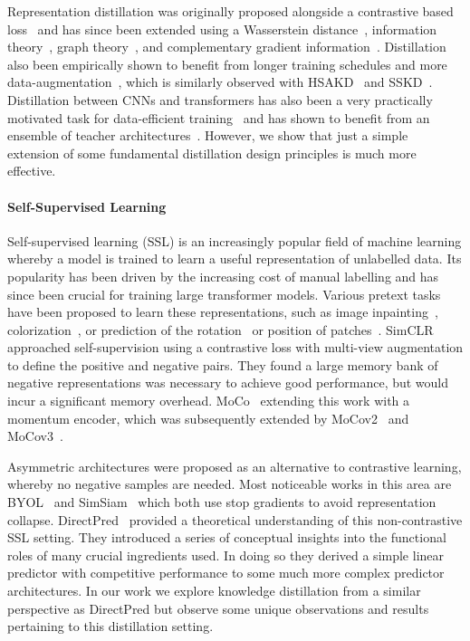 \documentclass[letterpaper]{article} \usepackage[submission]{aaai23}  \usepackage{times}  \usepackage{helvet}  \usepackage{courier}  \usepackage[hyphens]{url}  \usepackage{graphicx} \urlstyle{rm} \def\UrlFont{\rm}  \usepackage{natbib}  \usepackage{caption} \frenchspacing  \setlength{\pdfpagewidth}{8.5in} \setlength{\pdfpageheight}{11in} \usepackage{algorithm}
\begin{document}
Representation distillation was originally proposed alongside a contrastive based loss~\cite{Tian2019ContrastiveDistillation} and has since been extended using a Wasserstein distance~\cite{Chen2020WassersteinDistillation}, information theory~\cite{Miles2022InformationDistillation}, graph theory~\cite{Ma2022DistillingAlignment}, and complementary gradient information~\cite{Zhu2021ComplementaryDistillation}. Distillation also been empirically shown to benefit from longer training schedules and more data-augmentation~\cite{Beyer2022KnowledgeConsistent}, which is similarly observed with HSAKD~\cite{Yang2021HierarchicalDistillation} and SSKD~\cite{Xu2020KnowledgeSelf-supervision}.
Distillation between CNNs and transformers has also been a very practically motivated task for data-efficient training~\cite{Touvron2021TrainingAttention} and has shown to benefit from an ensemble of teacher architectures~\cite{Ren2022Co-advise:Distillation}. However, we show that just a simple extension of some fundamental distillation design principles is much more effective.

\paragraph{Self-Supervised Learning}
Self-supervised learning (SSL) is an increasingly popular field of machine learning whereby a model is trained to learn a useful representation of unlabelled data. Its popularity has been driven by the increasing cost of manual labelling and has since been crucial for training large transformer models. Various pretext tasks have been proposed to learn these representations, such as image inpainting~\cite{He2022MaskedLearners}, colorization~\cite{Zhang2016ColorfulColorization}, or prediction of the rotation~\cite{Gidaris2018UnsupervisedRotations} or position of patches~\cite{Doersch2015UnsupervisedPrediction, Carlucci2019DomainPuzzles}. SimCLR~\cite{Chen2020ARepresentations} approached self-supervision using a contrastive loss with multi-view augmentation to define the positive and negative pairs. They found a large memory bank of negative representations was necessary to achieve good performance, but would incur a significant memory overhead. MoCo~\cite{He2020MomentumLearning} extending this work with a momentum encoder, which was subsequently extended by MoCov2~\cite{Chen2020ImprovedLearning} and MoCov3~\cite{Chen2021AnTransformers}.


Asymmetric architectures were proposed as an alternative to contrastive learning, whereby no negative samples are needed. Most noticeable works in this area are BYOL~\cite{Grill2020BootstrapLearning} and SimSiam~\cite{Chen2021ExploringLearning} which both use stop gradients to avoid representation collapse. DirectPred~\cite{Tian2021UnderstandingPairs} provided a theoretical understanding of this non-contrastive SSL setting. They introduced a series of conceptual insights into the functional roles of many crucial ingredients used. In doing so they derived a simple linear predictor with competitive performance to some much more complex predictor architectures. In our work we explore knowledge distillation from a similar perspective as DirectPred but observe some unique observations and results pertaining to this distillation setting.
\end{document}

